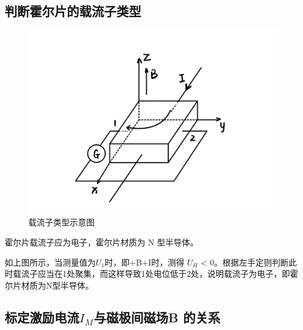 \documentclass[UTF8]{ctexart}
\begin{document}
\subsection{判断霍尔片的载流子类型}

\begin{figure}[H]
  \centering
  \includegraphics[scale=0.15]{载流子类型.jpg}
  \caption{载流子类型示意图} %
\end{figure}


霍尔片载流子应为电子，霍尔片材质为 N 型半导体。

如上图所示，当测量值为$U_1$时，即+B+I时，测得 $U_H$ < 0。根据左手定则判断此时载流子应当在1处聚集，而这样导致1处电位低于2处，说明载流子为电子，即霍尔片材质为N型半导体。


\subsection{标定激励电流$I_M$与磁极间磁场B 的关系}
\end{document}
